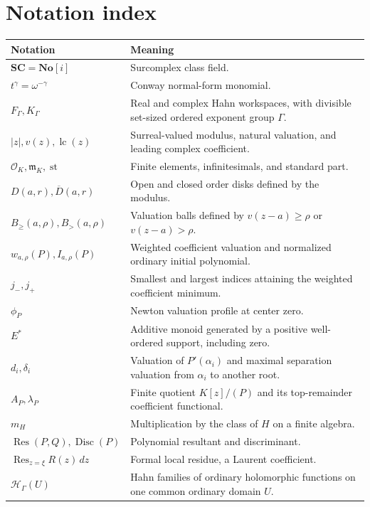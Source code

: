 \documentclass[11pt,letterpaper]{article}
\numberwithin{equation}{section}
\theoremstyle{definition}
\theoremstyle{remark}\newtheorem{remark}[theorem]{Remark}
\newcommand{\No}{\mathbf{No}}
\newcommand{\SC}{\mathbf{SC}}
\newcommand{\OO}{\mathcal O}
\newcommand{\mm}{\mathfrak m}
\newcommand{\HH}{\mathscr H_\Gamma}
\newcommand{\st}{\operatorname{st}}
\newcommand{\Res}{\operatorname{Res}}
\newcommand{\Disc}{\operatorname{Disc}}
\newcommand{\lc}{\operatorname{lc}}
\newcommand{\Bge}[2]{B_{\ge}(#1,#2)}
\newcommand{\Bgt}[2]{B_{>}(#1,#2)}
\begin{document}
\section{Notation index}\label{app:notation}
\begin{longtable}{@{}P{0.29\textwidth}P{0.63\textwidth}@{}}
\toprule
Notation & Meaning\\
\midrule
\endhead
$\SC=\No[i]$ & Surcomplex class field.\\[0.3em]
$t^\gamma=\omega^{-\gamma}$ & Conway normal-form monomial.\\[0.3em]
$F_\Gamma,K_\Gamma$ & Real and complex Hahn workspaces, with divisible
set-sized ordered exponent group $\Gamma$.\\[0.3em]
$|z|,v(z),\lc(z)$ & Surreal-valued modulus, natural valuation, and
leading complex coefficient.\\[0.3em]
$\OO_K,\mm_K,\st$ & Finite elements, infinitesimals, and standard part.\\[0.3em]
$D(a,r),\overline D(a,r)$ & Open and closed order disks defined by the
modulus.\\[0.3em]
$\Bge a\rho,\Bgt a\rho$ & Valuation balls defined by $v(z-a)\ge\rho$
or $v(z-a)>\rho$.\\[0.3em]
$w_{a,\rho}(P),I_{a,\rho}(P)$ & Weighted coefficient valuation and
normalized ordinary initial polynomial.\\[0.3em]
$j_-,j_+$ & Smallest and largest indices attaining the weighted
coefficient minimum.\\[0.3em]
$\phi_P$ & Newton valuation profile at center zero.\\[0.3em]
$E^*$ & Additive monoid generated by a positive well-ordered support,
including zero.\\[0.3em]
$d_i,\delta_i$ & Valuation of $P'(\alpha_i)$ and maximal separation
valuation from $\alpha_i$ to another root.\\[0.3em]
$A_P,\lambda_P$ & Finite quotient $K[z]/(P)$ and its top-remainder
coefficient functional.\\[0.3em]
$m_H$ & Multiplication by the class of $H$ on a finite algebra.\\[0.3em]
$\Res(P,Q),\Disc(P)$ & Polynomial resultant and discriminant.\\[0.3em]
$\Res_{z=\xi}R(z)\,dz$ & Formal local residue, a Laurent coefficient.\\[0.3em]
$\HH(U)$ & Hahn families of ordinary holomorphic functions on one
common ordinary domain $U$.\\
\bottomrule
\end{longtable}
\end{document}
